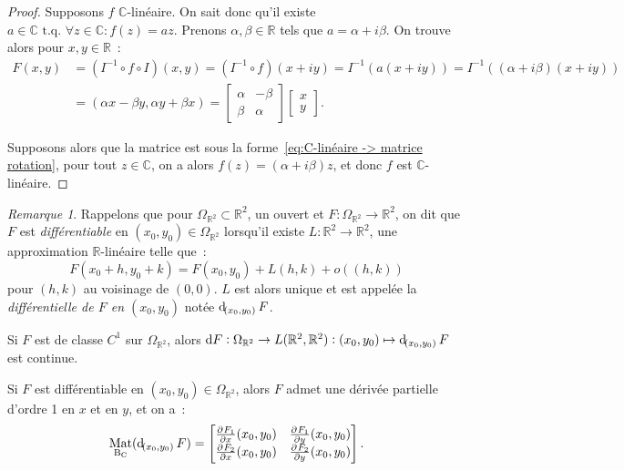 \documentclass{report}
\theoremstyle{definition}
\theoremstyle{remark}
\newtheorem*{rmq}{Remarque}
\numberwithin{equation}{section}
\newcommand{\C}{\mathbb C}
\newcommand{\R}{\mathbb R}
\newcommand{\tq}{\text{ t.q. }}
\DeclareMathOperator{\Mat}{Mat}
\DeclareMathOperator{\MatBC}{\Mat_{B_C}}
\begin{document}
			\begin{proof} Supposons $f$ $\C$-linéaire. On sait donc qu'il existe $a \in \C \tq \forall z \in \C : f(z) = az$. Prenons $\alpha, \beta \in \R$ tels que
			$a = \alpha + i\beta$. On trouve alors pour $x, y \in \R$~:
			\begin{align}
				F(x, y) &= (I^{-1} \circ f \circ I)(x, y) = (I^{-1} \circ f)(x+iy) = I^{-1}(a(x+iy)) = I^{-1}((\alpha + i\beta)(x+iy)) \\
				&= \left(\alpha x - \beta y, \alpha y + \beta x\right) = \begin{bmatrix}\alpha & -\beta \\\beta & \alpha\end{bmatrix}\begin{bmatrix}x \\ y\end{bmatrix}.
			\end{align}

			Supposons alors que la matrice est sous la forme~\eqref{eq:C-linéaire -> matrice rotation}, pour tout $z \in \C$, on a alors $f(z) = (\alpha + i\beta)z$,
			et donc $f$ est $\C$-linéaire.
			\end{proof}

			\begin{rmq} Rappelons que pour $\Omega_{\R^2} \subset \R^2$, un ouvert et $F : \Omega_{\R^2} \to \R^2$, on dit que $F$ est \textit{différentiable} en
			$(x_0, y_0) \in \Omega_{\R^2}$ lorsqu'il existe $L : \R^2 \to \R^2$, une approximation $\R$-linéaire telle que~:
			\begin{equation}
				F(x_0+h, y_0+k) = F(x_0, y_0) + L(h, k) + o((h, k))
			\end{equation}
			pour $(h, k)$ au voisinage de $(0, 0)$. $L$ est alors unique et est appelée la \textit{différentielle de $F$ en $(x_0, y_0)$} notée $\dif_{(x_0, y_0)}F$.

			Si $F$ est de classe $C^1$ sur $\Omega_{\R^2}$, alors $\dif F : \Omega_{\R^2} \to L(\R^2, \R^2) : (x_0, y_0) \mapsto \dif_{(x_0, y_0)}F$ est continue.

			Si $F$ est différentiable en $(x_0, y_0) \in \Omega_{\R^2}$, alors $F$ admet une dérivée partielle d'ordre 1 en $x$ et en $y$, et on a~:
			\begin{equation}
				\MatBC(\dif_{(x_0, y_0)}F) = \begin{bmatrix}\pd {F_1}x(x_0, y_0) & \pd {F_1}y(x_0, y_0) \\ \pd {F_2}x(x_0, y_0) & \pd {F_2}y(x_0, y_0)\end{bmatrix}.
			\end{equation}
			\end{rmq}
\end{document}
